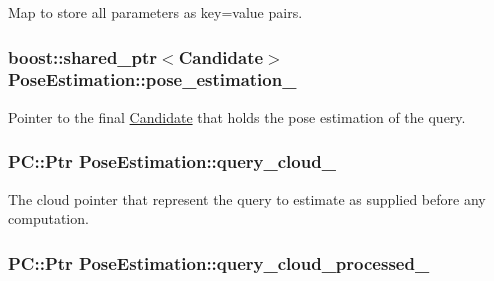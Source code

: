Map to store all parameters as key=value pairs. 

\hypertarget{classPoseEstimation_a75dc35326ae05d9b6de34537fe1df943}{
\subsubsection[{pose\-\_\-estimation\-\_\-}]{\setlength{\rightskip}{0pt plus 5cm}boost\-::shared\-\_\-ptr$<${\bf Candidate}$>$ Pose\-Estimation\-::pose\-\_\-estimation\-\_\-\hspace{0.3cm}{\ttfamily [private]}}}\label{classPoseEstimation_a75dc35326ae05d9b6de34537fe1df943}


Pointer to the final \hyperlink{classCandidate}{Candidate} that holds the pose estimation of the query. 

\hypertarget{classPoseEstimation_a624150566f5f26ef20a526dc2580a0c1}{
\subsubsection[{query\-\_\-cloud\-\_\-}]{\setlength{\rightskip}{0pt plus 5cm}P\-C\-::\-Ptr Pose\-Estimation\-::query\-\_\-cloud\-\_\-\hspace{0.3cm}{\ttfamily [private]}}}\label{classPoseEstimation_a624150566f5f26ef20a526dc2580a0c1}


The cloud pointer that represent the query to estimate as supplied before any computation. 

\hypertarget{classPoseEstimation_a8a08b75a2df62953f533b44cb45c69e3}{
\subsubsection[{query\-\_\-cloud\-\_\-processed\-\_\-}]{\setlength{\rightskip}{0pt plus 5cm}P\-C\-::\-Ptr Pose\-Estimation\-::query\-\_\-cloud\-\_\-processed\-\_\-\hspace{0.3cm}{\ttfamily [private]}}}\label{classPoseEstimation_a8a08b75a2df62953f533b44cb45c69e3}


